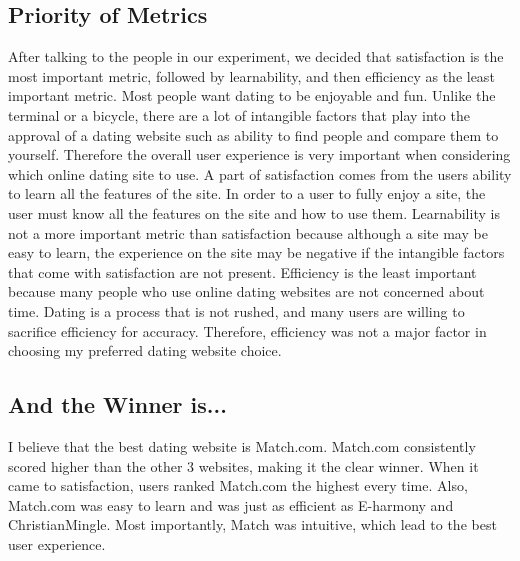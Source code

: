 \documentclass{article}
\begin{document}
\subsection{Priority of Metrics}
After talking to the people in our experiment, we decided that satisfaction is the most important metric, followed by learnability, and then efficiency as the least important metric. Most people want dating to be enjoyable and fun. Unlike the terminal or a bicycle, there are a lot of intangible factors that play into the approval of a dating website such as ability to find people and compare them to yourself. Therefore the overall user experience is very important when considering which online dating site to use. A part of satisfaction comes from the users ability to learn all the features of the site. In order to a user to fully enjoy a site, the user must know all the features on the site and how to use them. Learnability is not a more important metric than satisfaction because although a site may be easy to learn, the experience on the site may be negative if the intangible factors that come with satisfaction are not present. Efficiency is the least important because many people who use online dating websites are not concerned about time. Dating is a process that is not rushed, and many users are willing to sacrifice efficiency for accuracy. Therefore, efficiency was not a major factor in choosing my preferred dating website choice. 

\subsection{And the Winner is...}
I believe that the best dating website is Match.com. Match.com consistently scored higher than the other 3 websites, making it the clear winner. When it came to satisfaction, users ranked Match.com the highest every time. Also, Match.com was easy to learn and was just as efficient as E-harmony and ChristianMingle. Most importantly, Match was intuitive, which lead to the best user experience.  


\pagebreak
%
%
\end{document}

